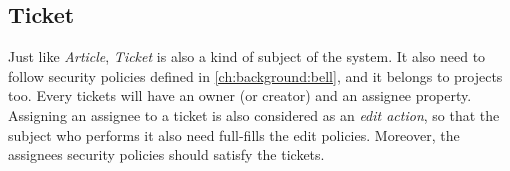 
\subsection{Ticket}
\label{ch:hopot_project:ticket}

Just like \emph{Article}, \emph{Ticket} is also a kind of subject of the system.
It also need to follow security policies defined in \autoref{ch:background:bell}, and it belongs to projects too.
Every tickets will have an owner (or creator) and an assignee property.
Assigning an assignee to a ticket is also considered as an \emph{edit action}, so that the subject who performs it also need full-fills the edit policies.
Moreover, the assignees security policies should satisfy the tickets.
